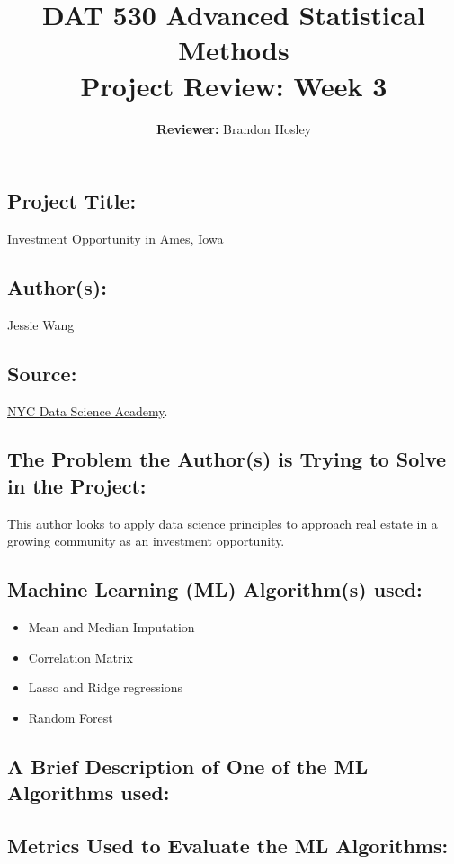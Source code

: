 \documentclass[]{article}
\title{\textbf{DAT 530 Advanced Statistical Methods}\\
	\normalsize{Project Review: Week 3} }
\author{\textbf{Reviewer: }
	Brandon Hosley}
\begin{document}
\setlength{\droptitle}{-10em} 
\pretitle{\begin{flushleft}\LARGE} %
	\posttitle{\end{flushleft}}
\preauthor{\begin{flushleft}\large} %
	\postauthor{\end{flushleft}}
\predate{\begin{flushleft}\large} %
	\postdate{\end{flushleft}}
\maketitle

\vspace{-2em}

\subsection*{Project Title:}
Investment Opportunity in Ames, Iowa

\subsection*{Author(s):}
Jessie Wang

\subsection*{Source:}
\href{https://nycdatascience.com/blog/student-works/investment-opportunity-in-ames-iowa/}{NYC Data Science Academy}.

\subsection*{The Problem the Author(s) is Trying to Solve in the Project:}
This author looks to apply data science principles to approach real estate in a growing community as an investment opportunity.

\subsection*{Machine Learning (ML) Algorithm(s) used:}
\begin{itemize}
	\item Mean and Median Imputation
	\item Correlation Matrix
	\item Lasso and Ridge regressions
	\item Random Forest
\end{itemize}

\subsection*{A Brief Description of One of the ML Algorithms used:}

\subsection*{Metrics Used to Evaluate the ML Algorithms:}
\end{document}
